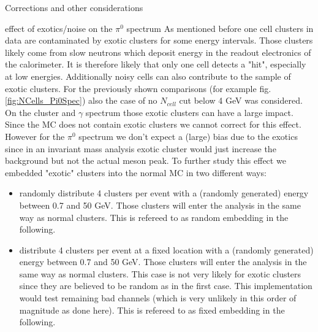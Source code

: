 \documentclass[ALICE]{ALICE_analysis_notes}
\begin{document}
\begin{section}{Corrections and other considerations}
\begin{subsection}{effect of exotics/noise on the $\pi^{0}$ spectrum}
As mentioned before one cell clusters in data are contaminated by exotic clusters for some energy intervals. Those clusters likely come from slow neutrons which deposit energy in the readout electronics of the calorimeter. It is therefore likely that only one cell detects a "hit", especially at low energies. Additionally noisy cells can also contribute to the sample of exotic clusters. For the previously shown comparisons (for example fig. \ref{fig:NCells_Pi0Spec}) also the case of no $N_{cell}$ cut below 4 GeV was considered. On the cluster and $\gamma$ spectrum those exotic clusters can have a large impact. Since the MC does not contain exotic clusters we cannot correct for this effect. However for the $\pi^{0}$ spectrum we don't expect a (large) bias due to the exotics since in an invariant mass analysis exotic cluster would just increase the background but not the actual meson peak. To further study this effect we embedded "exotic" clusters into the normal MC in two different ways:
\begin{itemize}
	\item randomly distribute 4 clusters per event with a (randomly generated) energy between 0.7 and 50 GeV. Those clusters will enter the analysis in the same way as normal clusters. This is refereed to as random embedding in the following.
	\item distribute 4 clusters per event at a fixed location with a (randomly generated) energy between 0.7 and 50 GeV. Those clusters will enter the analysis in the same way as normal clusters. This case is not very likely for exotic clusters since they are believed to be random as in the first case. This implementation would test remaining bad channels (which is very unlikely in this order of magnitude as done here). This is refereed to as fixed embedding in the following.
\end{itemize}




\end{subsection}
\end{section}
\end{document}
